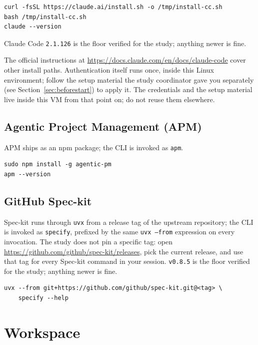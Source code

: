 \documentclass[11pt, a4paper]{article}
\begin{document}
\begin{verbatim}
curl -fsSL https://claude.ai/install.sh -o /tmp/install-cc.sh
bash /tmp/install-cc.sh
claude --version
\end{verbatim}

Claude Code \texttt{2.1.126} is the floor verified for the study; anything newer is fine.

The official instructions at \url{https://docs.claude.com/en/docs/claude-code} cover other install paths. Authentication itself runs once, inside this Linux environment; follow the setup material the study coordinator gave you separately (see Section~\ref{sec:beforestart}) to apply it. The credentials and the setup material live inside this VM from that point on; do not reuse them elsewhere.

\subsection{Agentic Project Management (APM)}
\label{sec:aitools:apm}

APM ships as an npm package; the CLI is invoked as \texttt{apm}.

\begin{verbatim}
sudo npm install -g agentic-pm
apm --version
\end{verbatim}

\subsection{GitHub Spec-kit}
\label{sec:aitools:speckit}

Spec-kit runs through \texttt{uvx} from a release tag of the upstream repository; the CLI is invoked as \texttt{specify}, prefixed by the same \texttt{uvx --from} expression on every invocation. The study does not pin a specific tag: open \url{https://github.com/github/spec-kit/releases}, pick the current release, and use that tag for every Spec-kit command in your session. \texttt{v0.8.5} is the floor verified for the study; anything newer is fine.

\begin{verbatim}
uvx --from git+https://github.com/github/spec-kit.git@<tag> \
    specify --help
\end{verbatim}

\section{Workspace}
\label{sec:workspace}
\end{document}

